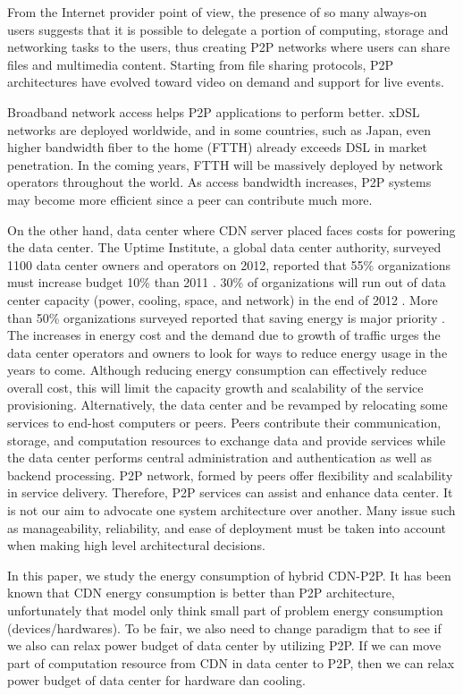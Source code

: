 \documentclass[JIP]{ipsj}
\begin{document}
From the Internet provider point of view, the presence of so many always-on users suggests that it is possible to delegate a portion of computing, storage and networking tasks to the users, thus creating P2P networks where users can share files and multimedia content.
Starting from file sharing protocols, P2P architectures have evolved toward video on demand and support for live events.

Broadband network access helps P2P applications to perform better.
xDSL networks are deployed worldwide, and in some countries, such as Japan, even higher bandwidth fiber to the home (FTTH) already exceeds DSL in market penetration.  In the coming years, FTTH will be massively deployed by network operators throughout the world.  
As access bandwidth increases, P2P systems may become more efficient since a peer can contribute much more.

On the other hand, data center where CDN server placed faces costs for powering the data center.
The Uptime Institute, a global data center authority, surveyed 1100 data center owners and operators on 2012, reported that 55\% organizations must increase budget 10\% than 2011 \cite{uptime}.  
30\% of organizations will run out of data center capacity (power, cooling, space, and network) in the end of 2012 \cite{uptime}. 
More than 50\% organizations surveyed reported that saving energy is major priority \cite{uptime}.
The increases in energy cost and the demand due to growth of traffic urges the data center operators and owners to look for ways to reduce energy usage in the years to come.
Although reducing energy consumption can effectively reduce overall cost, this will limit the capacity growth and scalability of the service provisioning.
Alternatively, the data center and be revamped by relocating some services to end-host computers or peers.
Peers contribute their communication, storage, and computation resources to exchange data and provide services while the data center performs central administration and authentication as well as backend processing.
P2P network, formed by peers offer flexibility and scalability in service delivery.
Therefore, P2P services can assist and enhance data center.
It is not our aim to advocate one system architecture over another.
Many issue such as manageability, reliability, and ease of deployment must be taken into account when making high level architectural decisions.

In this paper, we study the energy consumption of hybrid CDN-P2P.  
It has been known that CDN energy consumption is better than P2P architecture, unfortunately that model only think small part of problem energy consumption (devices/hardwares).
To be fair, we also need to change paradigm that to see if we also can relax power budget of data center by utilizing P2P.   
If we can move part of computation resource from CDN in data center to P2P, then we can relax power budget of data center for hardware dan cooling. 
\end{document}
